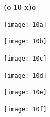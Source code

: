 \documentclass[12pt]{article}
\begin{document}
\hfill{\bf (o 10 x)o}\hfill\ 
\vfill

\hfill\texttt{[image: 10a]}\hfill~
\vfill

\hfill\texttt{[image: 10b]}\hfill~
\vfill

\hfill\texttt{[image: 10c]}\hfill~
\vfill

\hfill\texttt{[image: 10d]}\hfill~
\vfill

\hfill\texttt{[image: 10e]}\hfill~
\vfill

\hfill\texttt{[image: 10f]}\hfill~
\vfill\ 
\vfill\ 
\vfill\ 
\vfill\ 
\end{document}
